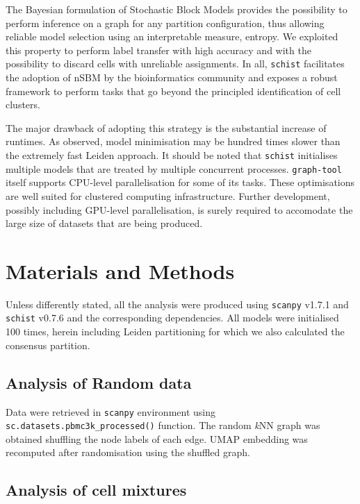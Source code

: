 \documentclass[10pt]{article}
\begin{document}
The Bayesian formulation of Stochastic Block Models provides the possibility to perform inference on a graph for any partition configuration, thus allowing reliable model selection using an interpretable measure, entropy. We exploited this property to perform label transfer with high accuracy and with the possibility to discard cells with unreliable assignments. In all, \texttt{schist} facilitates the adoption of nSBM by the bioinformatics community and exposes a robust framework to perform tasks that go beyond the principled identification of cell clusters. 

The major drawback of adopting this strategy is the substantial increase of runtimes. As observed, model minimisation may be hundred times slower than the extremely fast Leiden approach. It should be noted that \texttt{schist} initialises multiple models that are treated by multiple concurrent processes. \texttt{graph-tool} itself supports CPU-level parallelisation for some of its tasks. These optimisations are well suited for clustered computing infrastructure. Further development, possibly including GPU-level parallelisation, is surely required to accomodate the large size of datasets that are being produced.

\section*{Materials and Methods}

Unless differently stated, all the analysis were produced using \texttt{scanpy} v1.7.1 \cite{wolf_2018} and \texttt{schist} v0.7.6 and the corresponding dependencies. All models were initialised 100 times, herein including Leiden partitioning for which we also calculated the consensus partition.

\subsection*{Analysis of Random data}

Data were retrieved in \texttt{scanpy} environment using \texttt{sc.datasets.pbmc3k\_processed()} function. The random \emph{k}NN graph was obtained shuffling the node labels of each edge. UMAP embedding was recomputed after randomisation using the shuffled graph.

\subsection*{Analysis of cell mixtures}
\end{document}
